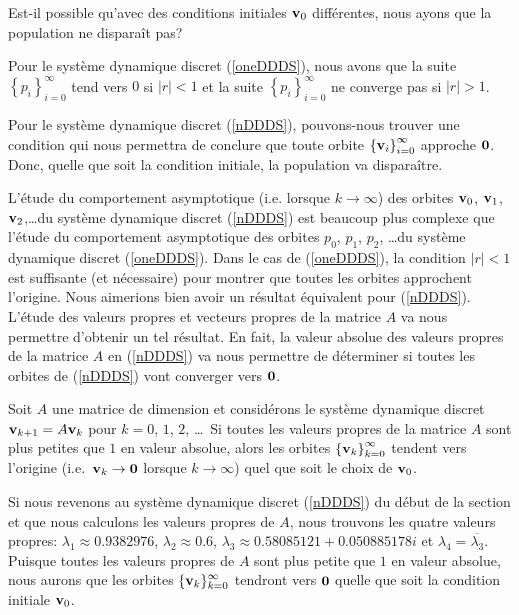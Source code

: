 {\begin{egg}
Est-il possible qu'avec des conditions initiales $\mathbf{v}_0$
différentes, nous ayons que la population ne disparaît pas?

Pour le système dynamique discret (\ref{oneDDDS}), nous avons que la suite
$\displaystyle \left\{p_i\right\}_{i=0}^\infty$ tend vers $0$ si
$|r|<1$ et la suite $\displaystyle \left\{p_i\right\}_{i=0}^\infty$ ne
converge pas si $|r| > 1$.  

Pour le système dynamique discret (\ref{nDDDS}), pouvons-nous trouver une
condition qui nous permettra de conclure que toute orbite
$\displaystyle \left\{\mathbf{v}_i\right\}_{i=0}^\infty$ approche
$\mathbf{0}$. Donc, quelle que soit la condition initiale, la population
va disparaître.
\label{alglinpopeg}
\end{egg}

L'étude du comportement asymptotique (i.e. lorsque
$k\rightarrow \infty$) des orbites $\mathbf{v}_0$, $\mathbf{v}_1$,
$\mathbf{v}_2$,\ldots du système dynamique discret (\ref{nDDDS}) est
beaucoup plus complexe que l'étude du comportement asymptotique des
orbites $p_0$, $p_1$, $p_2$, \ldots du système dynamique discret
(\ref{oneDDDS}).  Dans le cas de (\ref{oneDDDS}), la condition $|r|<1$
est suffisante (et nécessaire) pour montrer que toutes les orbites
approchent l'origine.  Nous aimerions bien avoir un résultat équivalent
pour (\ref{nDDDS}).  L'étude des
valeurs propres et vecteurs propres de la matrice $A$ va nous
permettre d'obtenir un tel résultat.  En fait, la valeur absolue des
valeurs propres de la matrice $A$ en (\ref{nDDDS}) va nous permettre
de déterminer si toutes les orbites de (\ref{nDDDS}) vont converger
vers $\mathbf{0}$.

\begin{prop}
Soit $A$ une matrice de dimension \nn et considérons le système
dynamique discret $\mathbf{v}_{k+1} = A \mathbf{v}_k$ pour $k=0$, $1$, $2$,
\ldots\   Si toutes les valeurs propres de la matrice $A$ sont
plus petites que $1$ en valeur absolue, alors les orbites
$\displaystyle \left\{ \mathbf{v}_k \right\}_{k=0}^\infty$ tendent vers
l'origine (i.e.\ $\mathbf{v}_k\rightarrow \mathbf{0}$ lorsque 
$k\rightarrow \infty$) quel que soit le choix de $\mathbf{v}_0$.
\end{prop}

\begin{egg}
Si nous revenons au système dynamique discret (\ref{nDDDS}) du début de
la section et que nous calculons les valeurs propres de $A$,
nous trouvons les quatre valeurs propres: $\lambda_1 \approx 0.9382976$,
$\lambda_2 \approx 0.6$, $\lambda_3 \approx 0.58085121 + 0.050885178 i$
et $\lambda_4 = \overline{\lambda_3}$.  Puisque toutes les valeurs
propres de $A$ sont plus petite que $1$ en valeur absolue, nous aurons que
les orbites $\displaystyle \{\mathbf{v}_k\}_{k=0}^\infty$ tendront vers
$\mathbf{0}$ quelle que soit la condition initiale $\mathbf{v}_0$.
\end{egg}

}
